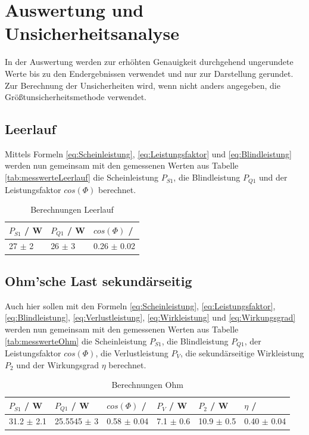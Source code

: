 \documentclass[12pt,a4paper,twoside]{article}
\begin{document}
\section{Auswertung und Unsicherheitsanalyse} %

In der Auswertung werden zur erhöhten Genauigkeit durchgehend ungerundete Werte bis zu den Endergebnissen verwendet und nur zur Darstellung gerundet. \\
Zur Berechnung der Unsicherheiten wird, wenn nicht anders angegeben, die Größtunsicherheitsmethode verwendet.

\subsection{Leerlauf}

Mittels Formeln \ref{eq:Scheinleistung}, \ref{eq:Leistungsfaktor} und \ref{eq:Blindleistung} werden nun gemeinsam mit den gemessenen Werten aus Tabelle \ref{tab:messwerteLeerlauf} die Scheinleistung $P_{S1}$, die Blindleistung $P_{Q1}$ und der Leistungsfaktor $cos(\Phi)$ berechnet.

\begin{table}[H]
    \centering
    \caption{Berechnungen Leerlauf}
    \label{tab:BerechnungenLeerlauf}
    \begin{tabular}{| l | l | l |}
        \hline
        $P_{S1}$ / W & $P_{Q1}$ / W & $cos(\Phi)$ / \\
        \hline
        27 $\pm$ 2 & 26 $\pm$ 3 & 0.26 $\pm$ 0.02 \\
        \hline
    \end{tabular}
\end{table}


\subsection{Ohm'sche Last sekundärseitig}

Auch hier sollen mit den Formeln \ref{eq:Scheinleistung}, \ref{eq:Leistungsfaktor}, \ref{eq:Blindleistung}, \ref{eq:Verlustleistung}, \ref{eq:Wirkleistung} und \ref{eq:Wirkungsgrad} werden nun gemeinsam mit den gemessenen Werten aus Tabelle \ref{tab:messwerteOhm} die Scheinleistung $P_{S1}$, die Blindleistung $P_{Q1}$, der Leistungsfaktor $cos(\Phi)$, die Verlustleistung $P_{V}$, die sekundärseitige Wirkleistung $P_{2}$ und der Wirkungsgrad $\eta$ berechnet.

\begin{table}[H]
    \centering
    \caption{Berechnungen Ohm}
    \label{tab:BerechnungenOhm}
    \begin{tabular}{| l | l | l | l | l | l |}
        \hline
        $P_{S1}$ / W & $P_{Q1}$ / W & $cos(\Phi)$ / & $P_{V}$ / W & $P_{2}$ / W & $\eta$ / \\
        \hline
        31.2 $\pm$ 2.1 & 25.5545 $\pm$ 3 & 0.58 $\pm$ 0.04 & 7.1 $\pm$ 0.6 & 10.9 $\pm$ 0.5 & 0.40 $\pm$ 0.04 \\
        \hline
    \end{tabular}
\end{table}
\end{document}

